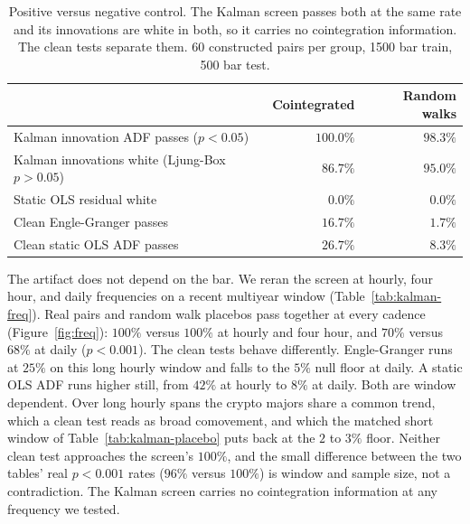 \documentclass[11pt]{article}
\begin{document}
\begin{table}[ht]
\centering
\caption{Positive versus negative control. The Kalman screen passes both at the same rate and its
innovations are white in both, so it carries no cointegration information. The clean tests separate
them. 60 constructed pairs per group, 1500 bar train, 500 bar test.}
\label{tab:poscontrol}
\begin{tabular}{lrr}
\toprule
& Cointegrated & Random walks \\
\midrule
Kalman innovation ADF passes ($p<0.05$) & $100.0\%$ & $98.3\%$ \\
Kalman innovations white (Ljung-Box $p>0.05$) & $86.7\%$ & $95.0\%$ \\
Static OLS residual white & $0.0\%$ & $0.0\%$ \\
Clean Engle-Granger passes & $16.7\%$ & $1.7\%$ \\
Clean static OLS ADF passes & $26.7\%$ & $8.3\%$ \\
\bottomrule
\end{tabular}
\end{table}

The artifact does not depend on the bar. We reran the screen at hourly, four hour, and daily
frequencies on a recent multiyear window (Table~\ref{tab:kalman-freq}). Real pairs and
random walk placebos pass together at every cadence (Figure~\ref{fig:freq}): $100\%$ versus
$100\%$ at hourly and four hour, and $70\%$ versus $68\%$ at daily ($p<0.001$). The clean tests behave differently.
Engle-Granger runs at $25\%$ on this long hourly window and falls to the $5\%$ null floor at
daily. A static OLS ADF runs higher still, from $42\%$ at hourly to $8\%$ at daily. Both are
window dependent. Over long hourly spans the crypto majors share a common trend, which a clean
test reads as broad comovement, and which the matched short window of
Table~\ref{tab:kalman-placebo} puts back at the $2$ to $3\%$ floor. Neither clean test approaches
the screen's $100\%$, and the small difference between the two tables' real $p<0.001$ rates
($96\%$ versus $100\%$) is window and sample size, not a contradiction. The Kalman screen
carries no cointegration information at any frequency we tested.
\end{document}
